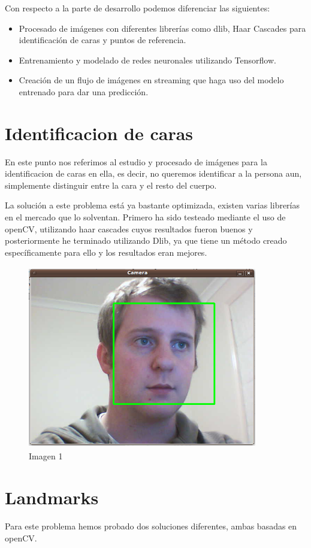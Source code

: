 \documentclass{article}
\begin{document}
Con respecto a la parte de desarrollo podemos diferenciar las siguientes:
\begin{itemize}
\item Procesado de imágenes con diferentes librerías como dlib, Haar Cascades para identificación de caras y puntos de referencia.
\item Entrenamiento y modelado de redes neuronales utilizando Tensorflow.
\item Creación de un flujo de imágenes en streaming que haga uso del modelo entrenado para dar una predicción.
\end{itemize}

\section{Identificacion de caras}
En este punto nos referimos al estudio y procesado de imágenes para la identificacion de caras en ella, es decir, no queremos identificar a la persona aun, simplemente distinguir entre la cara y el resto del cuerpo.

La solución a este problema está ya bastante optimizada, existen varias librerías en el mercado que lo solventan. Primero ha sido testeado mediante el uso de openCV, utilizando haar cascades cuyos resultados fueron buenos y posteriormente he terminado utilizando Dlib, ya que tiene un método creado específicamente para ello y los resultados eran mejores.

\begin{figure}[H]
  \centering
  \includegraphics[width=100mm, height=80mm]{images/face-detect_square.png}
  \caption{Imagen 1}
\end{figure}

\section{Landmarks}
Para este problema hemos probado dos soluciones diferentes, ambas basadas en openCV.  
\end{document}
